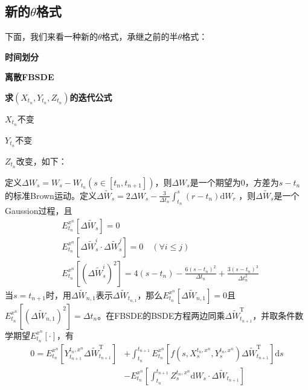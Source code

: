 	\subsection{新的$\theta$格式}
		下面，我们来看一种新的$\theta$格式，承继之前的半$\theta$格式：\par
		\textbf{时间划分}\par
		\textbf{离散FBSDE}\par
		\textbf{求$(X_{t_n},Y_{t_n},Z_{t_n})$的迭代公式}\par
		\checkmark $X_{t_n}$不变\par
		\checkmark $Y_{t_n}$不变\par
		\checkmark $Z_{t_n}$改变，如下：
		\par
		定义$\Delta {W}_s=W_{s}-W_{t_n}(s \in [t_n,t_{n+1}])$，则$\Delta {W}_s$是一个期望为0，方差为$s- t_n$ 的标准Brown运动。定义$\Delta {{\tilde W}_s} = 2\Delta {W_s} - \frac{3}{{\Delta {t_n}}}\int_{{t_n}}^s {({r - {t_n}} )\mathrm{d}{W_r}} $
		，则$\Delta {{\tilde W}_s}$是一个Gaussion过程，且
			\begin{align*}
		  		&E_{{t_n}}^{{x^n}}\left[ {\Delta {{\tilde W}_s}} \right] = 0\\
		  		&E_{{t_n}}^{{x^n}}\left[ {\Delta \tilde W_s^i \cdot \Delta \tilde W_s^j} \right] = 0\quad (\forall i\leqslant j )\\
		  		&E_{{t_n}}^{{x^n}}\left[ {{{\left( {\Delta \tilde W_s^i} \right)}^2}} \right] = 4 \left( {s - {t_n}} \right) - \frac{{6 {{\left( {s - {t_n}} \right)}^2}}}{{\Delta {t_n}}} + \frac{{3{{\left( {s - {t_n}} \right)}^3}}}{{\Delta t_n^2}}
			\end{align*}
		当$s=t_{n+1}$时，用${\Delta {{\tilde W}_{n,1}}}$表示${\Delta {{\tilde W}_{t_{n,1}}}}$，那么$E_{{t_n}}^{{x^n}}\left[ {\Delta {{\tilde W}_{n,1}}} \right] = 0$且$ E_{{t_n}}^{{x^n}}\left[ {{{\left( {\Delta {{\tilde W}_{n,1}}} \right)}^2}} \right] = \Delta {t_n}$。在FBSDE的BSDE方程两边同乘${\Delta \tilde W_{{t_{n + 1}}}^\mathrm{T}}$，并取条件数学期望$E_{t_n}^{x^n}[\cdot]$，有
				\begin{equation*}
				\begin{split}
				0 = E_{{t_n}}^{{x^n}}\left[ {Y_{{t_{n + 1}}}^{{t_n},{x^n}}\Delta \tilde W_{{t_{n + 1}}}^\mathrm{T}} \right] &+ \int_{{t_n}}^{{t_{n + 1}}} {E_{{t_n}}^{{x^n}}\left[ {f\left( {s,X_s^{{t_n},{x^n}},Y_s^{{t_n},{x^n}}} \right)\Delta \tilde W_{{t_{n + 1}}}^\mathrm{T}} \right]} \mathrm{d}s \\
				&- E_{{t_n}}^{{x^n}}\left[ {\int_{{t_n}}^{{t_{n + 1}}} {Z_s^{{t_n},{x^n}}\mathrm{d}{W_s} \cdot \Delta {{\tilde W}_{{t_{n + 1}}}}} } \right]
				\end{split}
				\end{equation*}
